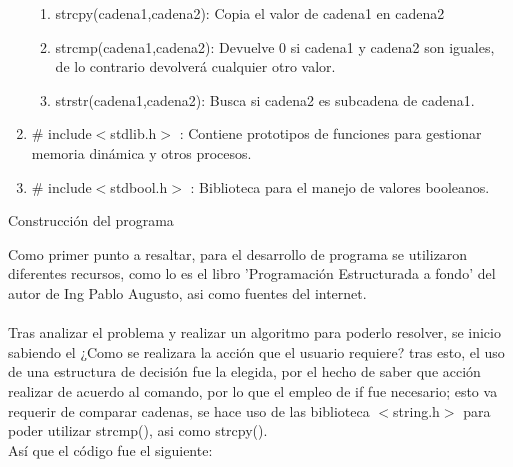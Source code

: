 \documentclass[12pt,letterpaper]{report}
\begin{document}
\begin{enumerate}
\begin{enumerate}
\item strcpy(cadena1,cadena2): Copia el valor de cadena1 en cadena2
\item strcmp(cadena1,cadena2): Devuelve 0 si cadena1 y cadena2 son iguales, de lo contrario devolverá cualquier otro valor.
\item strstr(cadena1,cadena2): Busca si cadena2 es subcadena de cadena1.

\end{enumerate}

\item \# include$<$stdlib.h$>$ : Contiene prototipos de funciones para gestionar memoria dinámica y otros procesos.

\item \# include$<$stdbool.h$>$ : Biblioteca para el manejo de valores booleanos.

\end{enumerate}



\newpage
\begin{center}
Construcción del programa
\end{center}

Como primer punto a resaltar, para el desarrollo de programa se utilizaron diferentes recursos, como lo es el libro 'Programación Estructurada a fondo' del autor de Ing Pablo Augusto, asi como fuentes del internet.\\\\
Tras analizar el problema y realizar un algoritmo para poderlo resolver, se inicio sabiendo el ¿Como se realizara la acción que el usuario requiere? tras esto, el uso de una estructura de decisión fue la elegida, por el hecho de saber que acción realizar de acuerdo al comando, por lo que el empleo de if fue necesario; esto va requerir de comparar cadenas, se hace uso de las biblioteca $<$string.h$>$ para poder utilizar strcmp(), asi como strcpy().\\
Así que el código fue el siguiente:
\end{document}
